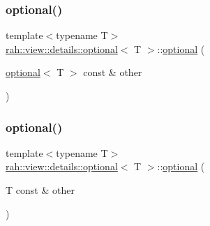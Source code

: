 \mbox{\label{structrah_1_1view_1_1details_1_1optional_a8c15e1445849715fdef5bf9bfdf43a91}} 
\subsubsection{\texorpdfstring{optional()}{optional()}\hspace{0.1cm}{\footnotesize\ttfamily [2/3]}}
{\footnotesize\ttfamily template$<$typename T$>$ \\
\mbox{\hyperlink{structrah_1_1view_1_1details_1_1optional}{rah\+::view\+::details\+::optional}}$<$ T $>$\+::\mbox{\hyperlink{structrah_1_1view_1_1details_1_1optional}{optional}} (\begin{DoxyParamCaption}\item[{\mbox{\hyperlink{structrah_1_1view_1_1details_1_1optional}{optional}}$<$ T $>$ const \&}]{other }\end{DoxyParamCaption})\hspace{0.3cm}{\ttfamily [inline]}}

\mbox{\label{structrah_1_1view_1_1details_1_1optional_a67103a826656faabd3a8d12fea4a6b33}} 
\subsubsection{\texorpdfstring{optional()}{optional()}\hspace{0.1cm}{\footnotesize\ttfamily [3/3]}}
{\footnotesize\ttfamily template$<$typename T$>$ \\
\mbox{\hyperlink{structrah_1_1view_1_1details_1_1optional}{rah\+::view\+::details\+::optional}}$<$ T $>$\+::\mbox{\hyperlink{structrah_1_1view_1_1details_1_1optional}{optional}} (\begin{DoxyParamCaption}\item[{T const \&}]{other }\end{DoxyParamCaption})\hspace{0.3cm}{\ttfamily [inline]}}

